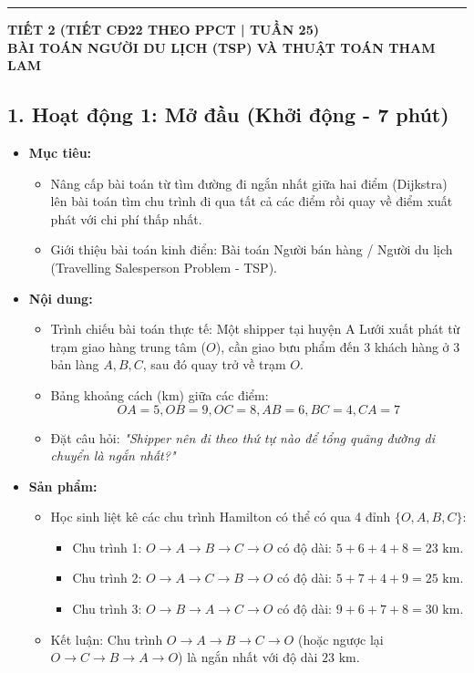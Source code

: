 \documentclass[12pt, a4paper]{article}
\begin{document}
\vspace{10pt}
\hrule
\vspace{10pt}

\begin{center}
    \textbf{\large TIẾT 2 (TIẾT CĐ22 THEO PPCT | TUẦN 25)}\\[4pt]
    \textbf{\large BÀI TOÁN NGƯỜI DU LỊCH (TSP) VÀ THUẬT TOÁN THAM LAM}
\end{center}

\subsection*{1. Hoạt động 1: Mở đầu (Khởi động - 7 phút)}

\begin{itemize}[leftmargin=1.2cm]
    \item[a)] \textbf{Mục tiêu:}
    \begin{itemize}[leftmargin=0.6cm]
        \item Nâng cấp bài toán từ tìm đường đi ngắn nhất giữa hai điểm (Dijkstra) lên bài toán tìm chu trình đi qua tất cả các điểm rồi quay về điểm xuất phát với chi phí thấp nhất.
        \item Giới thiệu bài toán kinh điển: Bài toán Người bán hàng / Người du lịch (Travelling Salesperson Problem - TSP).
    \end{itemize}

    \item[b)] \textbf{Nội dung:}
    \begin{itemize}[leftmargin=0.6cm]
        \item Trình chiếu bài toán thực tế: Một shipper tại huyện A Lưới xuất phát từ trạm giao hàng trung tâm ($O$), cần giao bưu phẩm đến 3 khách hàng ở 3 bản làng $A, B, C$, sau đó quay trở về trạm $O$.
        \item Bảng khoảng cách (km) giữa các điểm:
        $$OA = 5, OB = 9, OC = 8, AB = 6, BC = 4, CA = 7$$
        \item Đặt câu hỏi: \textit{"Shipper nên đi theo thứ tự nào để tổng quãng đường di chuyển là ngắn nhất?"}
    \end{itemize}

    \item[c)] \textbf{Sản phẩm:}
    \begin{itemize}[leftmargin=0.6cm]
        \item Học sinh liệt kê các chu trình Hamilton có thể có qua 4 đỉnh $\{O, A, B, C\}$:
        \begin{itemize}
            \item Chu trình 1: $O \to A \to B \to C \to O$ có độ dài: $5 + 6 + 4 + 8 = 23\text{ km}$.
            \item Chu trình 2: $O \to A \to C \to B \to O$ có độ dài: $5 + 7 + 4 + 9 = 25\text{ km}$.
            \item Chu trình 3: $O \to B \to A \to C \to O$ có độ dài: $9 + 6 + 7 + 8 = 30\text{ km}$.
        \end{itemize}
        \item Kết luận: Chu trình $O \to A \to B \to C \to O$ (hoặc ngược lại $O \to C \to B \to A \to O$) là ngắn nhất với độ dài $23\text{ km}$.
    \end{itemize}


\end{itemize}
\end{document}
